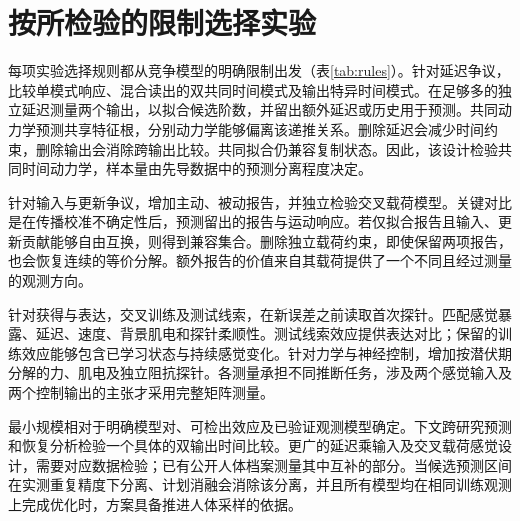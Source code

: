 \documentclass[11pt,a4paper]{article}
\begin{document}
\section{按所检验的限制选择实验}
每项实验选择规则都从竞争模型的明确限制出发（表\ref{tab:rules}）。针对延迟争议，比较单模式响应、混合读出的双共同时间模式及输出特异时间模式。在足够多的独立延迟测量两个输出，以拟合候选阶数，并留出额外延迟或历史用于预测。共同动力学预测共享特征根，分别动力学能够偏离该递推关系。删除延迟会减少时间约束，删除输出会消除跨输出比较。共同拟合仍兼容复制状态。因此，该设计检验共同时间动力学，样本量由先导数据中的预测分离程度决定。

针对输入与更新争议，增加主动、被动报告，并独立检验交叉载荷模型。关键对比是在传播校准不确定性后，预测留出的报告与运动响应。若仅拟合报告且输入、更新贡献能够自由互换，则得到兼容集合。删除独立载荷约束，即使保留两项报告，也会恢复连续的等价分解。额外报告的价值来自其载荷提供了一个不同且经过测量的观测方向。

针对获得与表达，交叉训练及测试线索，在新误差之前读取首次探针。匹配感觉暴露、延迟、速度、背景肌电和探针柔顺性。测试线索效应提供表达对比；保留的训练效应能够包含已学习状态与持续感觉变化。针对力学与神经控制，增加按潜伏期分解的力、肌电及独立阻抗探针。各测量承担不同推断任务，涉及两个感觉输入及两个控制输出的主张才采用完整矩阵测量。\cite{coin2021,franklin2003,unlearning2016}

最小规模相对于明确模型对、可检出效应及已验证观测模型确定。下文跨研究预测和恢复分析检验一个具体的双输出时间比较。更广的延迟乘输入及交叉载荷感觉设计，需要对应数据检验；已有公开人体档案测量其中互补的部分。当候选预测区间在实测重复精度下分离、计划消融会消除该分离，并且所有模型均在相同训练观测上完成优化时，方案具备推进人体采样的依据。
\end{document}
